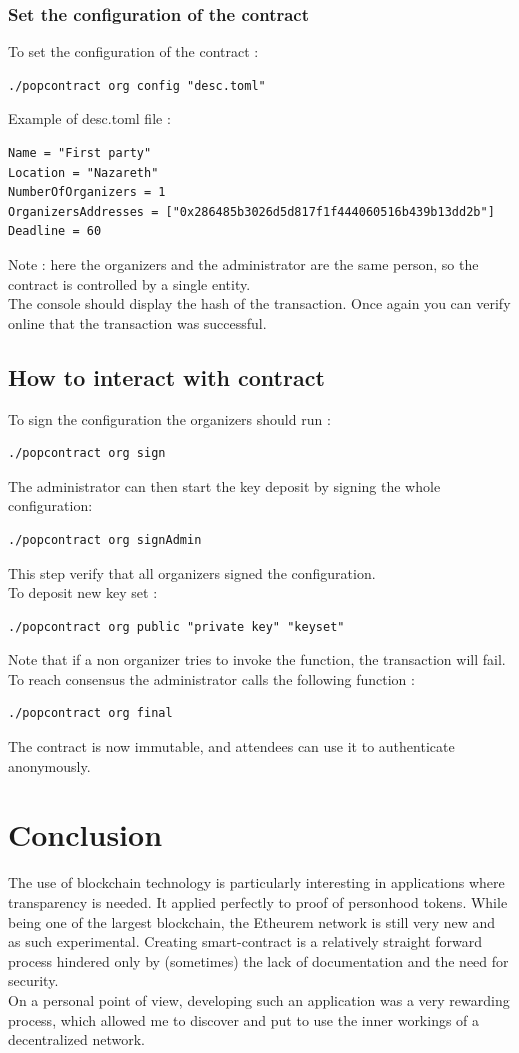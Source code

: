 \documentclass[11pt, a4paper, twoside, openright]{book} %
\begin{document}
\subsubsection*{Set the configuration of the contract}

To set the configuration of the contract :
\begin{verbatim}
./popcontract org config "desc.toml"
\end{verbatim}
Example of desc.toml file :
\begin{verbatim}
Name = "First party"
Location = "Nazareth"
NumberOfOrganizers = 1
OrganizersAddresses = ["0x286485b3026d5d817f1f444060516b439b13dd2b"]
Deadline = 60
\end{verbatim}
Note : here the organizers and the administrator are the same person, so the contract is controlled by a single entity.\\
The console should display the hash of the transaction. Once again you can verify online that the transaction was successful.

\subsection{How to interact with contract}
To sign the configuration the organizers should run :
\begin{verbatim}
./popcontract org sign
\end{verbatim}
The administrator can then start the key deposit by signing the whole configuration:
\begin{verbatim}
./popcontract org signAdmin
\end{verbatim}
This step verify that all organizers signed the configuration. \\
To deposit new key set :
\begin{verbatim}
./popcontract org public "private key" "keyset"
\end{verbatim}
Note that if a non organizer tries to invoke the function, the transaction will fail.
To reach consensus the administrator calls the following function :
\begin{verbatim}
./popcontract org final
\end{verbatim}
The contract is now immutable, and attendees can use it to authenticate anonymously.
\section{Conclusion}
The use of blockchain technology is particularly interesting in applications where transparency is needed. It applied perfectly to proof of
personhood tokens. While being one of the largest blockchain, the Etheurem network is still very new and as such experimental. Creating smart-contract is a relatively straight forward process hindered only by
(sometimes) the lack of documentation and the need for security.\\
On a personal point of view, developing such an application was a very rewarding process, which allowed me to discover and put to use the inner workings
of a decentralized network.
\end{document}
